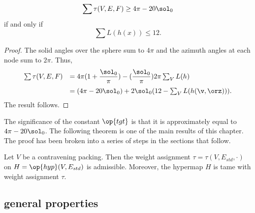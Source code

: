\begin{lemma}
\begin{displaymath}
\sum \tau (V,E,F) \ge 4\pi - 20\sol_0
\end{displaymath}
if and only if
\begin{displaymath}
\sum L(h(x)) \le 12.
\end{displaymath}
\end{lemma}

\begin{proof}
  The solid angles over the sphere sum to $4\pi$ and the azimuth
  angles at each node sum to $2\pi$.
Thus,
\begin{equation}\label{eqn:delta0}
\begin{array}{lll}
  \sum \tau (V,E,F) 
  &= 4\pi (1 + \dfrac{\sol_0}{\pi}) 
- (\dfrac{\sol_0}{\pi}) 2\pi \sum_{V} L(h)\vspace{6pt}\\
&= (4\pi - 20\sol_0) + 2\sol_0 (12 - \sum_V L(h(\v,\orz))).
\end{array}
\end{equation}
The result follows.
\end{proof}

The significance of the constant $\op{tgt}$ is that it is
approximately equal to $4\pi - 20\sol_0$.
%
The following theorem is one of the main results of this chapter.  The
proof has been broken into a series of steps in the sections that
follow.

\begin{theorem} \label{theorem:contravene}
  Let $V$ be a contravening packing.  Then the weight assignment
  $\tau=\tau(V,E_{std},\cdot)$ on $H=\op{hyp}(V,E_{std})$ is
  admissible.  Moreover, the hypermap $H$ is tame with weight
  assignment $\tau$.
\end{theorem}
%
%
%



\subsection{general properties}
\label{sec:startame}


